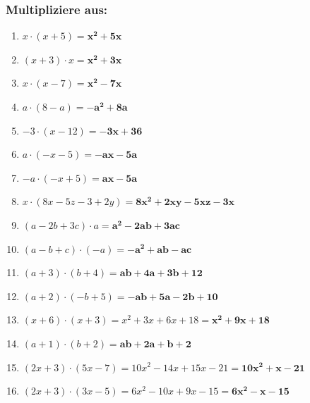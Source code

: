 \documentclass[a4paper,10pt]{article} %
\begin{document}
\subsubsection{Multipliziere aus:} %

\begin{enumerate}[label=\alph*)]

  \item \(x \cdot (x + 5) =
    \mathbf{x^2 + 5x}\) %

  \item \((x + 3) \cdot x =
    \mathbf{x^2 + 3x}\) %

  \item \(x \cdot (x - 7) =
    \mathbf{x^2 - 7x}\) %

  \item \(a \cdot (8 - a) =
    \mathbf{-a^2 + 8a}\) %

  \item \(-3 \cdot (x - 12) =
    \mathbf{-3x + 36}\) %

  \item \(a \cdot (-x - 5) =
    \mathbf{-ax - 5a}\) %

  \item \(-a \cdot (-x + 5) =
    \mathbf{ax - 5a}\) %

  \item \(x \cdot (8x - 5z - 3 + 2y) =
    \mathbf{8x^2 + 2xy - 5xz - 3x}\) %

  \item \((a - 2b + 3c) \cdot a =
    \mathbf{a^2 - 2ab + 3ac}\) %

  \item \((a - b + c) \cdot (-a) =
    \mathbf{-a^2 + ab - ac}\) %

  \item \((a + 3) \cdot (b + 4) =
    \mathbf{ab + 4a + 3b + 12}\) %

  \item \((a + 2) \cdot (-b + 5) =
    \mathbf{-ab + 5a - 2b + 10}\) %

  \item \((x + 6) \cdot (x + 3) =
    x^2 + 3x + 6x + 18 =
    \mathbf{x^2 + 9x + 18}\) %

  \item \((a + 1) \cdot (b + 2) =
    \mathbf{ab + 2a + b + 2}\) %

  \item \((2x + 3) \cdot (5x - 7) =
    10x^2 - 14x + 15x - 21 =
    \mathbf{10x^2 + x - 21}\) %

  \item \((2x + 3) \cdot (3x - 5) =
    6x^2 - 10x + 9x - 15 =
    \mathbf{6x^2 - x - 15} \) %

\end{enumerate}
\end{document}
